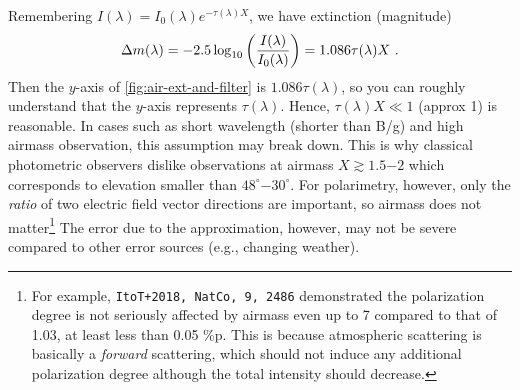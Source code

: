 Remembering $ I(\lambda) = I_0(\lambda) e^{-\tau(\lambda) X} $, we have extinction (magnitude)
\begin{equation*}
  \Delta m(\lambda) 
    = -2.5 \log_{10} \qty( \frac{I(\lambda)}{I_0(\lambda)} ) 
    = 1.086 \tau(\lambda) X ~.
\end{equation*} 
Then the $ y $-axis of \cref{fig:air-ext-and-filter} is $ 1.086 \tau(\lambda) $, so you can roughly understand that the $ y $-axis represents $ \tau(\lambda) $. Hence, $ \tau(\lambda) X \ll 1 $ (approx 1) is reasonable. In cases such as short wavelength (shorter than B/g) and high airmass observation, this assumption may break down. This is why classical photometric observers dislike observations at airmass $ X \gtrsim 1.5\mathrm{-}2 $ which corresponds to elevation smaller than $ 48^\circ \mathrm{-} 30^\circ$. For polarimetry, however, only the \emph{ratio} of two electric field vector directions are important, so airmass does not matter\footnote{For example, \texttt{ItoT+2018, NatCo, 9, 2486} demonstrated the polarization degree is not seriously affected by airmass even up to 7 compared to that of 1.03, at least less than 0.05 \%p. This is because atmospheric scattering is basically a \emph{forward} scattering, which should not induce any additional polarization degree although the total intensity should decrease.} The error due to the approximation, however, may not be severe compared to other error sources (e.g., changing weather). 

